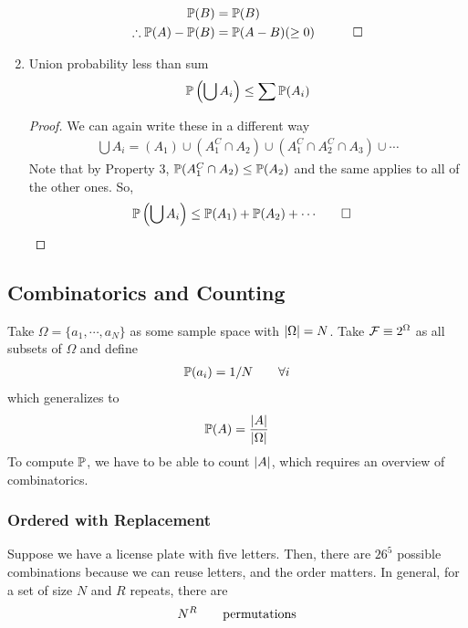 \begin{enumerate}
\begin{align}
        \mathbb{P}(B) &= \mathbb{P}(B)\\
        \therefore \mathbb{P}(A) - \mathbb{P}(B) &= \mathbb{P}(A - B) (\ge 0) & \qedhere
    \end{align}
    \item Union probability less than sum
    \begin{align}
        \mathbb{P}\left( \bigcup A_i \right) \le \sum \mathbb{P}(A_i)
    \end{align}
    \begin{proof}
        We can again write these in a different way
        \begin{align}
            \bigcup A_i = (A_1) \cup (A_1^C \cap A_2) \cup (A_1^C \cap A_2^C \cap A_3) \cup \cdots
        \end{align}
        Note that by Property 3, $\mathbb{P}(A_1^C \cap A_2) \le \mathbb{P}(A_2)$ and the same applies to all of the other ones. So,
        \begin{align}
            \mathbb{P}\left( \bigcup A_i \right) \le \mathbb{P}(A_1) + \mathbb{P}(A_2) + \cdots & \qedhere
        \end{align}
    \end{proof}
\end{enumerate}


\subsection{Combinatorics and Counting}
Take $\Omega = \{ a_1, \cdots, a_N \}$ as some sample space with $\abs{\Omega} = N$. Take $\mathcal{F} \equiv 2^\Omega$ as all subsets of $\Omega$ and define
\begin{align}
    \probability(a_i) = 1/N \qsp \forall i
\end{align}
which generalizes to
\begin{align}
    \mathbb{P}(A) = \dfrac{\abs{A}}{\abs{\Omega}}
\end{align}
To compute $\mathbb{P}$, we have to be able to count $\abs{A}$, which requires an overview of combinatorics. 

\subsubsection{Ordered with Replacement}
Suppose we have a license plate with five letters. Then, there are $26^5$ possible combinations because we can reuse letters, and the order matters. In general, for a set of size $N$ and $R$ repeats, there are
\begin{align}
    N^R \qsp \text{permutations}
\end{align}

